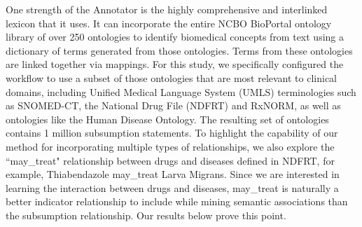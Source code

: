 One strength of the Annotator is the highly comprehensive and interlinked lexicon that it uses. It can incorporate the entire NCBO BioPortal ontology library of over 250 ontologies to identify biomedical concepts from text using a dictionary of terms generated from those ontologies. Terms from these ontologies are linked together via mappings. For this study, we specifically configured the workflow to use a subset of those ontologies that are most relevant to clinical domains, including Unified Medical Language System (UMLS) terminologies such as SNOMED-CT, the National Drug File (NDFRT) and RxNORM, as well as ontologies like the Human Disease Ontology. The resulting set of ontologies contains 1 million subsumption statements.
To highlight the capability of our method for incorporating multiple types of relationships, we also explore the ``may\_treat" relationship between drugs and diseases defined in NDFRT, for example, Thiabendazole may\_treat Larva Migrans. Since we are interested in learning the interaction between drugs and diseases, may\_treat is naturally a better indicator relationship to include while mining semantic associations than the subsumption relationship. Our results below prove this point.


